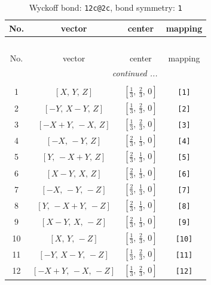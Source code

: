 \documentclass[fleqn,8pt]{jsarticle}
\begin{document}
\renewcommand{\arraystretch}{1.2}
\begin{longtable}{cccc}
\caption{Wyckoff bond: {\tt 12c@2c}, bond symmetry: {\tt 1}}
 \\
 \hline \hline
No. & vector & center & mapping \\ \hline \endfirsthead

\multicolumn{3}{l}{\tablename\ \thetable{}} \\
 \hline \hline
No. & vector & center & mapping \\ \hline \endhead

 \hline \hline
\multicolumn{3}{r}{\footnotesize\it continued ...} \\ \endfoot

 \hline \hline
\multicolumn{3}{r}{} \\ \endlastfoot

1 & $\left[ X,\, Y,\, Z \right]$ & $\left[ \frac{1}{3},\, \frac{2}{3},\, 0 \right]$ & {\tt [1]} \\ \hline
2 & $\left[ - Y,\, X - Y,\, Z \right]$ & $\left[ \frac{1}{3},\, \frac{2}{3},\, 0 \right]$ & {\tt [2]} \\ \hline
3 & $\left[ - X + Y,\, - X,\, Z \right]$ & $\left[ \frac{1}{3},\, \frac{2}{3},\, 0 \right]$ & {\tt [3]} \\ \hline
4 & $\left[ - X,\, - Y,\, Z \right]$ & $\left[ \frac{2}{3},\, \frac{1}{3},\, 0 \right]$ & {\tt [4]} \\ \hline
5 & $\left[ Y,\, - X + Y,\, Z \right]$ & $\left[ \frac{2}{3},\, \frac{1}{3},\, 0 \right]$ & {\tt [5]} \\ \hline
6 & $\left[ X - Y,\, X,\, Z \right]$ & $\left[ \frac{2}{3},\, \frac{1}{3},\, 0 \right]$ & {\tt [6]} \\ \hline
7 & $\left[ - X,\, - Y,\, - Z \right]$ & $\left[ \frac{2}{3},\, \frac{1}{3},\, 0 \right]$ & {\tt [7]} \\ \hline
8 & $\left[ Y,\, - X + Y,\, - Z \right]$ & $\left[ \frac{2}{3},\, \frac{1}{3},\, 0 \right]$ & {\tt [8]} \\ \hline
9 & $\left[ X - Y,\, X,\, - Z \right]$ & $\left[ \frac{2}{3},\, \frac{1}{3},\, 0 \right]$ & {\tt [9]} \\ \hline
10 & $\left[ X,\, Y,\, - Z \right]$ & $\left[ \frac{1}{3},\, \frac{2}{3},\, 0 \right]$ & {\tt [10]} \\ \hline
11 & $\left[ - Y,\, X - Y,\, - Z \right]$ & $\left[ \frac{1}{3},\, \frac{2}{3},\, 0 \right]$ & {\tt [11]} \\ \hline
12 & $\left[ - X + Y,\, - X,\, - Z \right]$ & $\left[ \frac{1}{3},\, \frac{2}{3},\, 0 \right]$ & {\tt [12]} \\
\end{longtable}
\end{document}
